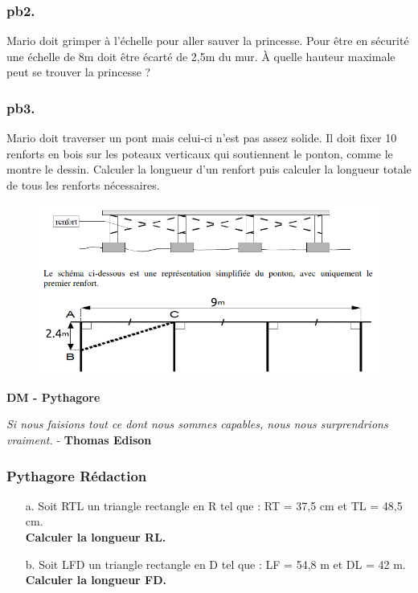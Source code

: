 \subsubsection*{pb2.} 

Mario doit grimper à l'échelle pour aller sauver la princesse. Pour être en sécurité une échelle de 8m doit être écarté de 2,5m du mur. À quelle hauteur maximale peut se trouver la princesse ? \\

\vspace{1cm}

\subsubsection*{pb3.}  

Mario doit traverser un pont mais celui-ci n'est pas assez solide. Il doit fixer 10 renforts en bois sur les poteaux verticaux qui soutiennent le ponton, comme le montre le dessin. Calculer la longueur d'un renfort puis calculer la longueur totale de tous les renforts nécessaires. 
  
\begin{figure}[H]
  \centering
  \includegraphics[width=0.6\linewidth]{4x7-pythagore-1/pb4a.png}
\end{figure}

\newpage


\textbf{DM - Pythagore}\\


\begin{center}
  \textit{Si nous faisions tout ce dont nous sommes capables, nous nous surprendrions vraiment.}  - \textbf{Thomas Edison}
\end{center}

\vspace{1cm} 

\subsubsection*{Pythagore Rédaction}

\begin{multicols}{2}
\begin{enumerate}
  \item[a.]Soit RTL un triangle rectangle en R tel que : RT = 37,5 cm et TL = 48,5 cm. \\
  \textbf{Calculer la longueur RL.}

  \item[b.]Soit LFD un triangle rectangle en D tel que : LF = 54,8 m et DL = 42 m. \\
  \textbf{Calculer la longueur FD.}

\end{enumerate}
\end{multicols}

